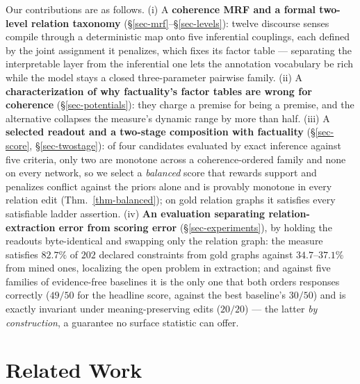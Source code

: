 Our contributions are as follows. (i) A \textbf{coherence MRF and a formal two-level relation taxonomy}
(\S\ref{sec-mrf}--\S\ref{sec-levels}): twelve discourse senses compile through a deterministic map onto five
inferential couplings, each defined by the joint assignment it penalizes, which fixes its factor table ---
separating the interpretable layer from the inferential one lets the annotation vocabulary be rich while the
model stays a closed three-parameter pairwise family. (ii) A \textbf{characterization of why factuality's
factor tables are wrong for coherence} (\S\ref{sec-potentials}): they charge a premise for being a premise, and
the alternative collapses the measure's dynamic range by more than half. (iii) A \textbf{selected readout and a
two-stage composition with factuality} (\S\ref{sec-score}, \S\ref{sec-twostage}): of four candidates evaluated
by exact inference against five criteria, only two are monotone across a coherence-ordered family and none on every
network, so we select a \emph{balanced} score that rewards support and penalizes conflict against the priors alone
and is provably monotone in every relation edit (Thm.~\ref{thm-balanced}); on gold relation graphs it satisfies
every satisfiable ladder assertion. (iv) \textbf{An evaluation
separating relation-extraction error from scoring error} (\S\ref{sec-experiments}), by holding the readouts
byte-identical and swapping only the relation graph: the measure satisfies $82.7\%$ of $202$ declared constraints
from gold graphs against $34.7$--$37.1\%$ from mined ones, localizing the open problem in extraction; and against
five families of evidence-free baselines it is the only one that both orders responses correctly ($49/50$ for the
headline score, against the best baseline's $30/50$) and is exactly invariant under meaning-preserving edits
($20/20$) --- the latter \emph{by construction}, a guarantee no surface statistic can offer.

\section{Related Work}
\label{sec-related}

